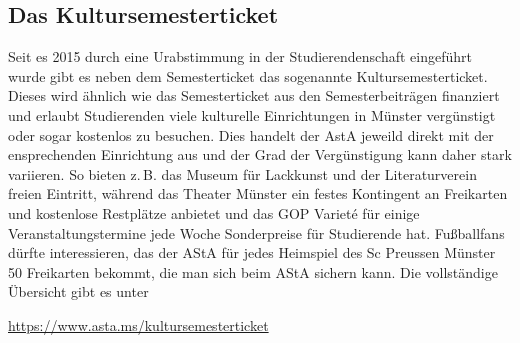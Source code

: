 
\subsection{Das Kultursemesterticket}
Seit es 2015 durch eine Urabstimmung in der Studierendenschaft eingeführt wurde gibt es neben dem Semesterticket das sogenannte Kultursemesterticket. Dieses wird ähnlich wie das Semesterticket aus den Semesterbeiträgen finanziert und erlaubt Studierenden viele kulturelle Einrichtungen in Münster vergünstigt oder sogar kostenlos zu besuchen. Dies handelt der AstA jeweild direkt mit der ensprechenden Einrichtung aus und der Grad der Vergünstigung kann daher stark variieren. So bieten z.\,B. das Museum für Lackkunst und der Literaturverein freien Eintritt,  während das Theater Münster ein festes Kontingent an Freikarten und kostenlose Restplätze anbietet und das GOP Variet\'e für einige Veranstaltungstermine jede Woche Sonderpreise für Studierende hat. Fußballfans dürfte interessieren, das der AStA für jedes Heimspiel des Sc Preussen Münster 50 Freikarten bekommt, die man sich beim AStA sichern kann.
Die vollständige Übersicht gibt es unter
\vspace{-1ex}
\begin{center}
	\url{https://www.asta.ms/kultursemesterticket}
\end{center}

\smallskip
